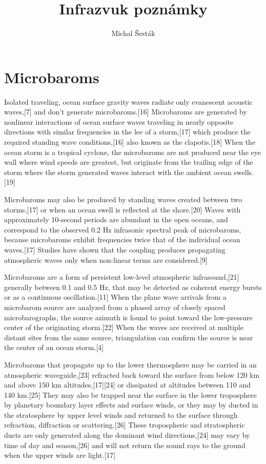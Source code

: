 \documentclass[10pt,a4paper]{article}
\author{Michal Šesták}
\title{Infrazvuk poznámky}
\begin{document}
\renewcommand{\figurename}{Fig.}
\renewcommand{\tablename}{Tab.}
\maketitle
\section{Microbaroms}
Isolated traveling, ocean surface gravity waves radiate only evanescent acoustic waves,[7] and don't generate microbaroms.[16] Microbaroms are generated by nonlinear interactions of ocean surface waves traveling in nearly opposite directions with similar frequencies in the lee of a storm,[17] which produce the required standing wave conditions,[16] also known as the clapotis.[18] When the ocean storm is a tropical cyclone, the microbaroms are not produced near the eye wall where wind speeds are greatest, but originate from the trailing edge of the storm where the storm generated waves interact with the ambient ocean swells.[19]

Microbaroms may also be produced by standing waves created between two storms,[17] or when an ocean swell is reflected at the shore.[20] Waves with approximately 10-second periods are abundant in the open oceans, and correspond to the observed 0.2 Hz infrasonic spectral peak of microbaroms, because microbaroms exhibit frequencies twice that of the individual ocean waves.[17] Studies have shown that the coupling produces propagating atmospheric waves only when non-linear terms are considered.[9]

Microbaroms are a form of persistent low-level atmospheric infrasound,[21] generally between 0.1 and 0.5 Hz, that may be detected as coherent energy bursts or as a continuous oscillation.[11] When the plane wave arrivals from a microbarom source are analyzed from a phased array of closely spaced microbarographs, the source azimuth is found to point toward the low-pressure center of the originating storm.[22] When the waves are received at multiple distant sites from the same source, triangulation can confirm the source is near the center of an ocean storm.[4]

Microbaroms that propagate up to the lower thermosphere may be carried in an atmospheric waveguide,[23] refracted back toward the surface from below 120 km and above 150 km altitudes,[17][24] or dissipated at altitudes between 110 and 140 km.[25] They may also be trapped near the surface in the lower troposphere by planetary boundary layer effects and surface winds, or they may by ducted in the stratosphere by upper level winds and returned to the surface through refraction, diffraction or scattering.[26] These tropospheric and stratospheric ducts are only generated along the dominant wind directions,[24] may vary by time of day and season,[26] and will not return the sound rays to the ground when the upper winds are light.[17]
\end{document}
